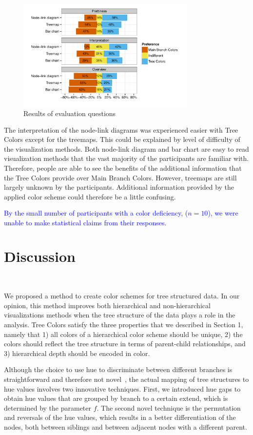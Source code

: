 \documentclass[journal]{vgtc}                %
\newcommand{\changedM}[1]{\textcolor{blue}{#1}}
\begin{document}
\begin{figure}[tb]
  \centering
	\includegraphics[width=3.5in]{user_study_results2.pdf}
  \caption{Results of evaluation questions}\label{fig:user2}
\end{figure}

The interpretation of the node-link diagrams was experienced easier with Tree Colors except for the treemaps. This could be explained by level of difficulty of the visualization methods. Both node-link diagram and bar chart are easy to read visualization methods that the vast majority of the participants are familiar with. Therefore, people are able to see the benefits of the additional information that the Tree Colors provide over Main Branch Colors. However, treemaps are still largely unknown by the participants. Additional information provided by the applied color scheme could therefore be a little confusing.

\changedM{By the small number of participants with a color deficiency, ($n=10$), we were unable to make statistical claims from their responses. } 


\section{Discussion}~\label{secdisc}

We proposed a method to create color schemes for tree structured data. In our opinion, this method improves both hierarchical and non-hierarchical visualizations methods when the tree structure of the data plays a role in the analysis. Tree Colors satisfy the three properties that we described in Section 1, namely that 1) all colors of a hierarchical color scheme should be unique, 2) the colors should reflect the tree structure in terms of parent-child relationships, and 3) hierarchical depth should be encoded in color. 

Although the choice to use hue to discriminate between different branches is straightforward and therefore not novel~\cite{yang2002, lam2012}, the actual mapping of tree structures to hue values involves two innovative techniques. First, we introduced hue gaps to obtain hue values that are grouped by branch to a certain extend, which is determined by the parameter $f$. The second novel technique is the permutation and reversals of the hue values, which results in a better differentiation of the nodes, both between siblings and between adjacent nodes with a different parent.
\end{document}
